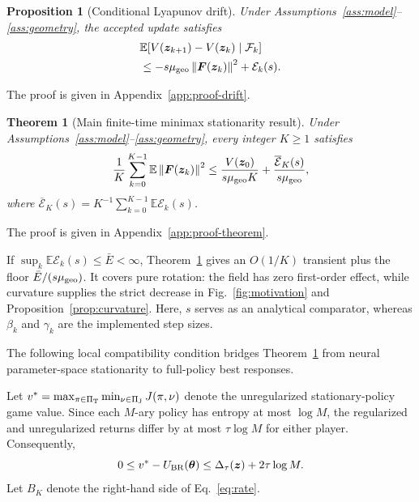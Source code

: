 \documentclass[conference]{IEEEtran}
\newcommand{\bF}{\bm{F}}
\newcommand{\bz}{\bm{z}}
\newcommand{\btheta}{\bm{\theta}}
\newcommand{\E}{\mathbb{E}}
\newcommand{\norm}[1]{\left\lVert #1\right\rVert}
\newtheorem{proposition}{Proposition}
\newtheorem{theorem}{Theorem}
\begin{document}
\begin{proposition}[Conditional Lyapunov drift]
\label{prop:drift}
Under Assumptions~\ref{ass:model}--\ref{ass:geometry}, the accepted update satisfies
\[
\begin{aligned}
&\E[V(\bz_{k+1})-V(\bz_k)\mid\mathcal F_k]\\
&\leq-s\mu_{\rm geo}\norm{\bF(\bz_k)}^2
+\mathcal E_k(s).
\end{aligned}
\]
\end{proposition}

The proof is given in Appendix~\ref{app:proof-drift}.

\begin{theorem}[Main finite-time minimax stationarity result]
\label{thm:stationarity}
Under Assumptions~\ref{ass:model}--\ref{ass:geometry}, every integer $K\geq1$ satisfies
\begin{equation}
\frac1K\sum_{k=0}^{K-1}\E\norm{\bF(\bz_k)}^2
\leq
\frac{V(\bz_0)}{s\mu_{\rm geo}K}
+\frac{\overline{\mathcal E}_K(s)}{s\mu_{\rm geo}},
\label{eq:rate}
\end{equation}
where $\overline{\mathcal E}_K(s)=K^{-1}\sum_{k=0}^{K-1}\E\mathcal E_k(s)$.
\end{theorem}

The proof is given in Appendix~\ref{app:proof-theorem}.

If $\sup_k\E\mathcal E_k(s)\leq\bar E<\infty$, Theorem~\ref{thm:stationarity} gives an $O(1/K)$ transient plus the floor $\bar E/(s\mu_{\rm geo})$.
It covers pure rotation: the field has zero first-order effect, while curvature supplies the strict decrease in Fig.~\ref{fig:motivation} and Proposition~\ref{prop:curvature}.
Here, $s$ serves as an analytical comparator, whereas $\beta_k$ and $\gamma_k$ are the implemented step sizes.

The following local compatibility condition bridges Theorem~\ref{thm:stationarity} from neural parameter-space stationarity to full-policy best responses.

Let $v^*=\max_{\pi\in\Pi_{\rm T}}\min_{\nu\in\Pi_{\rm J}}J(\pi,\nu)$ denote the unregularized stationary-policy game value.
Since each $M$-ary policy has entropy at most $\log M$, the regularized and unregularized returns differ by at most $\tau\log M$ for either player.
Consequently,
\begin{equation}
0\leq v^*-U_{\rm BR}(\btheta)\leq\Delta_\tau(\bz)+2\tau\log M.
\label{eq:performance_bridge}
\end{equation}
Let $B_K$ denote the right-hand side of Eq.~\eqref{eq:rate}.
\end{document}
